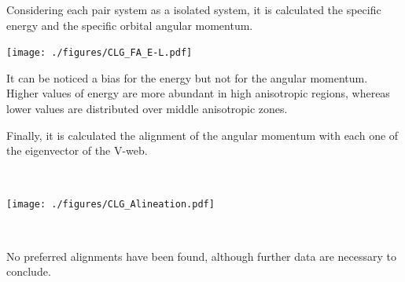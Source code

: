 \documentclass[8pt,fleqn]{beamer}
\begin{document}
\begin{frame}
\begin{tcolorbox}[colback=white!5,colframe=black!75!black,title=Energy and Angular Momentum of LG-like systems]\justifying

	Considering each pair system as a isolated system, it is calculated the
	specific energy and the specific orbital angular momentum. 

	\centering
	\texttt{[image: ./figures/CLG\_FA\_E-L.pdf]}
	
	\justifying
	It can be noticed a bias for the energy but not for the angular momentum.
	Higher values of energy are more abundant in high anisotropic regions, whereas
	lower values are distributed over middle anisotropic zones.

\end{tcolorbox}
\end{frame}
\begin{frame}
\begin{tcolorbox}[colback=white!5,colframe=black!75!black,title=Alignment of LG-like systems]\justifying

	Finally, it is calculated the alignment of the angular momentum with
	each one of the eigenvector of the V-web.
	
	\
	
	\centering
	\texttt{[image: ./figures/CLG\_Alineation.pdf]}
	
	\	
			
	\justifying
	No preferred alignments have been found, although further data are necessary
	to conclude.

\end{tcolorbox}
\end{frame}
\end{document}
